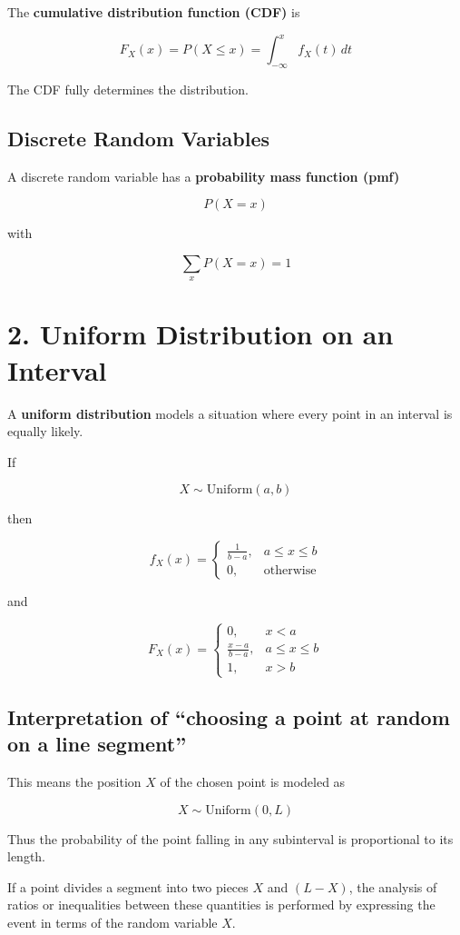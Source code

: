 \documentclass[12pt]{article}
\begin{document}
The \textbf{cumulative distribution function (CDF)} is

\[
F_X(x) = P(X \le x) = \int_{-\infty}^{x} f_X(t)\,dt
\]

The CDF fully determines the distribution.

\subsection*{Discrete Random Variables}

A discrete random variable has a \textbf{probability mass function (pmf)}

\[
P(X = x)
\]

with

\[
\sum_x P(X=x)=1
\]

\section*{2. Uniform Distribution on an Interval}

A \textbf{uniform distribution} models a situation where every point in an interval is equally likely.

If

\[
X \sim \text{Uniform}(a,b)
\]

then

\[
f_X(x)=
\begin{cases}
\frac{1}{b-a}, & a \le x \le b \\
0, & \text{otherwise}
\end{cases}
\]

and

\[
F_X(x)=
\begin{cases}
0, & x<a \\
\frac{x-a}{b-a}, & a\le x\le b \\
1, & x>b
\end{cases}
\]

\subsection*{Interpretation of ``choosing a point at random on a line segment''}

This means the position $X$ of the chosen point is modeled as

\[
X \sim \text{Uniform}(0,L)
\]

Thus the probability of the point falling in any subinterval is proportional to its length.

If a point divides a segment into two pieces $X$ and $(L-X)$, the analysis of ratios or inequalities between these quantities is performed by expressing the event in terms of the random variable $X$.
\end{document}
